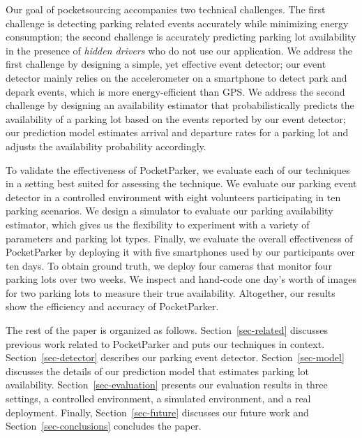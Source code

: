 Our goal of pocketsourcing accompanies two technical challenges. The first
challenge is detecting parking related events accurately while minimizing energy
consumption; the second challenge is accurately predicting parking lot
availability in the presence of {\it hidden drivers} who do not use our
application. We address the first challenge by designing a simple, yet effective
event detector; our event detector mainly relies on the accelerometer on a
smartphone to detect park and depark events, which is more energy-efficient than
GPS. We address the second challenge by designing an availability estimator that
probabilistically predicts the availability of a parking lot based on the events
reported by our event detector; our prediction model estimates arrival and
departure rates for a parking lot and adjusts the availability probability
accordingly.

To validate the effectiveness of PocketParker, we evaluate each of our
techniques in a setting best suited for assessing the technique. We evaluate
our parking event detector in a controlled environment with eight volunteers
participating in ten parking scenarios. We design a simulator to evaluate our
parking availability estimator, which gives us the flexibility to experiment
with a variety of parameters and parking lot types. Finally, we evaluate the
overall effectiveness of PocketParker by deploying it with five smartphones used
by our participants over ten days. To obtain ground truth, we deploy four
cameras that monitor four parking lots over two weeks. We inspect and hand-code
one day's worth of images for two parking lots to measure their true
availability. Altogether, our results show the efficiency and accuracy of
PocketParker.

The rest of the paper is organized as follows. Section~\ref{sec-related}
discusses previous work related to PocketParker and puts our techniques in
context. Section~\ref{sec-detector} describes our parking event detector.
Section~\ref{sec-model} discusses the details of our prediction model that
estimates parking lot availability. Section~\ref{sec-evaluation} presents our
evaluation results in three settings, a controlled environment, a simulated
environment, and a real deployment. Finally, Section~\ref{sec-future} discusses
our future work and Section~\ref{sec-conclusions} concludes the paper.

